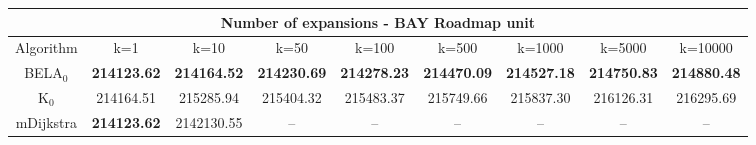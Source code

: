 \begin{tabular}{c|cccccccc}\toprule
\multicolumn{9}{c}{Number of expansions - BAY Roadmap unit}\\ \midrule
Algorithm & k=1 & k=10 & k=50 & k=100 & k=500 & k=1000 & k=5000 & k=10000 \\ \midrule
BELA$_0$ & \textbf{214123.62} & \textbf{214164.52} & \textbf{214230.69} & \textbf{214278.23} & \textbf{214470.09} & \textbf{214527.18} & \textbf{214750.83} & \textbf{214880.48} \\
K$_0$ & 214164.51 & 215285.94 & 215404.32 & 215483.37 & 215749.66 & 215837.30 & 216126.31 & 216295.69 \\
mDijkstra & \textbf{214123.62} & 2142130.55 & -- & -- & -- & -- & -- & -- \\ \bottomrule 
\end{tabular}
